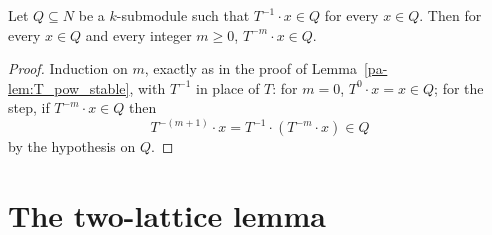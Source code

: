 \begin{lemma}
  \label{pa-lem:T_inv_pow_stable}
  \leanok

  Let \(Q \subseteq N\) be a \(k\)-submodule such that \(T^{-1} \cdot x \in Q\) for every
  \(x \in Q\). Then for every \(x \in Q\) and every integer \(m \ge 0\),
  \(T^{-m} \cdot x \in Q\).
\end{lemma}
\begin{proof}
  \leanok
  Induction on \(m\), exactly as in the proof of Lemma~\ref{pa-lem:T_pow_stable}, with \(T^{-1}\)
  in place of \(T\): for \(m = 0\), \(T^0 \cdot x = x \in Q\); for the step, if
  \(T^{-m} \cdot x \in Q\) then
  \[
    T^{-(m+1)} \cdot x = T^{-1} \cdot (T^{-m} \cdot x) \in Q
  \]
  by the hypothesis on \(Q\).
\end{proof}

\section{The two-lattice lemma}

